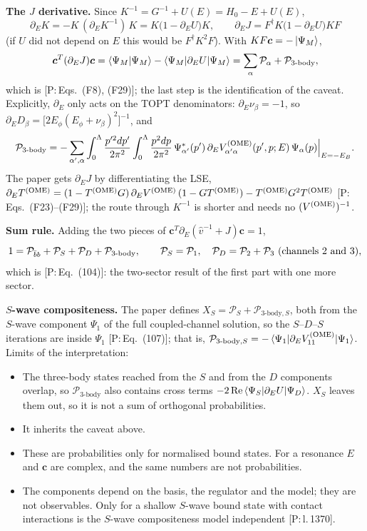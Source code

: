 \documentclass[11pt]{article}
\newcommand{\Pbb}{{\cal P}_{\bar bb}}
\newcommand{\tagP}[1]{\textcolor{blue!65!black}{\textsf{\small[P:\,#1]}}}
\newenvironment{aiadd}{\par}{\par}
\begin{document}
\begin{aiadd}
	\textbf{The $J$ derivative.} Since $K^{-1}=G^{-1}+U(E)=H_0-E+U(E)$,
	\[
		\partial_EK=-K\,(\partial_EK^{-1})\,K=K\big(1-\partial_EU\big)K,\qquad
		\partial_EJ=F^\dagger K\big(1-\partial_EU\big)KF
	\]
	(if $U$ did not depend on $E$ this would be $F^\dagger K^2F$). With $KF\bm c=-\ket{\Psi_M}$,
	\[
		\bm c^T(\partial_EJ)\bm c=\braket{\Psi_M|\Psi_M}-\braket{\Psi_M|\partial_EU|\Psi_M}=\sum_\alpha\mathcal P_\alpha+\mathcal P_{\text{3-body}},
	\]
	which is \tagP{Eqs.~(F8), (F29)}; the last step is the identification of the caveat. Explicitly, $\partial_E$ only acts on the TOPT denominators: $\partial_E\nu_\beta=-1$, so $\partial_ED_\beta=\big[2E_\phi(E_\phi+\nu_\beta)^2\big]^{-1}$, and
	\[
		\mathcal P_{\text{3-body}}=-\sum_{\alpha',\alpha}\int_0^\Lambda\frac{p'^2dp'}{2\pi^2}\int_0^\Lambda\frac{p^2dp}{2\pi^2}\,\Psi^*_{\alpha'}(p')\,\partial_EV^{\rm (OME)}_{\alpha'\alpha}(p',p;E)\,\Psi_\alpha(p)\Big|_{E=-E_B}.
	\]
	The paper gets $\partial_EJ$ by differentiating the LSE, $\partial_ET^{\rm (OME)}=(1-T^{\rm (OME)} G)\,\partial_EV^{\rm (OME)}\,(1-GT^{\rm (OME)})-T^{\rm (OME)} G^2T^{\rm (OME)}$ \tagP{Eqs.~(F23)--(F29)}; the route through $K^{-1}$ is shorter and needs no $(V^{\rm (OME)})^{-1}$.

	\textbf{Sum rule.} Adding the two pieces of $\bm c^T\partial_E(\hat v^{-1}+J)\bm c=1$,
	\[
		1=\Pbb+\mathcal P_S+\mathcal P_D+\mathcal P_{\text{3-body}},\qquad \mathcal P_S=\mathcal P_1,\quad \mathcal P_D=\mathcal P_2+\mathcal P_3\ \text{(channels 2 and 3)},
	\]
	which is \tagP{Eq.~(104)}: the two-sector result of the first part with one more sector.

	\textbf{$S$-wave compositeness.} The paper defines $X_S=\mathcal P_S+\mathcal P_{\text{3-body},S}$, both from the $S$-wave component $\Psi_1$ of the full coupled-channel solution, so the $S$--$D$--$S$ iterations are inside $\Psi_1$ \tagP{Eq.~(107)}; that is, $\mathcal P_{\text{3-body},S}=-\braket{\Psi_1|\partial_EV^{\rm (OME)}_{11}|\Psi_1}$. Limits of the interpretation:
	\begin{itemize}
		\item The three-body states reached from the $S$ and from the $D$ components overlap, so $\mathcal P_{\text{3-body}}$ also contains cross terms $-2\,\mathrm{Re}\braket{\Psi_S|\partial_EU|\Psi_D}$. $X_S$ leaves them out, so it is not a sum of orthogonal probabilities.
		\item It inherits the caveat above.
		\item These are probabilities only for normalised bound states. For a resonance $E$ and $\bm c$ are complex, and the same numbers are not probabilities.
		\item The components depend on the basis, the regulator and the model; they are not observables. Only for a shallow $S$-wave bound state with contact interactions is the $S$-wave compositeness model independent \tagP{l.\,1370}.
	\end{itemize}
\end{aiadd}


\end{document}
